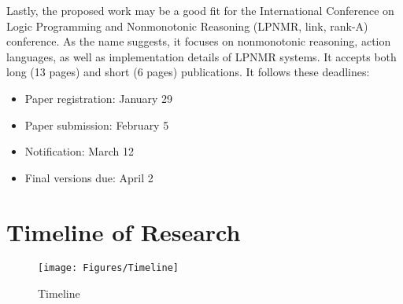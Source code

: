 Lastly, the proposed work may be a good fit for the International Conference on Logic Programming and Nonmonotonic Reasoning (LPNMR, link, rank-A) conference.
As the name suggests, it focuses on nonmonotonic reasoning, action languages, as well as implementation details of LPNMR systems.
It accepts both long (13 pages) and short (6 pages) publications.
It follows these deadlines:

\begin{itemize}
    \item Paper registration: January 29
    \item Paper submission: February 5
    \item Notification: March 12
    \item Final versions due: April 2
\end{itemize}

\section{Timeline of Research}

\begin{figure}[h]
    \centering
    \texttt{[image: Figures/Timeline]}
    \caption{Timeline}
    \label{fig:timeline}
\end{figure}
